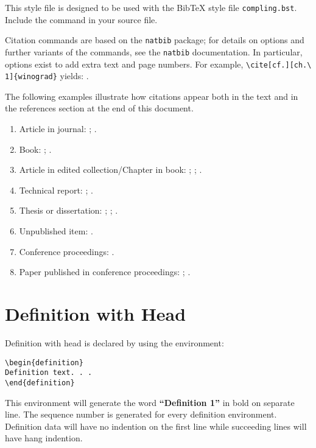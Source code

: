 \documentclass{clv3}
\begin{document}
This style file is designed to be used with the BibTeX
style file \verb|compling.bst|.  Include the command
\verb|| in your source file.

Citation commands are based on the \verb|natbib| package;
for details on options and further variants of the commands,
see the \verb|natbib| documentation.  In particular, options
exist to add extra text and page numbers.  For example,
\verb|\cite[cf.][ch.\ 1]{winograd}| yields: \cite[cf.][ch.\ 1]{winograd}.

The following examples illustrate how citations appear both in the text
and in the references section at the end of this document.
\begin{enumerate}
\item Article in journal:
 ;
 .
\item Book:
  ;
  .
\item Article in edited collection/Chapter in book:
  ;
  ;
  .
\item Technical report:
  ;
  .
\item Thesis or dissertation:
  ;
  ;
  .
\item Unpublished item:
  .
\item Conference proceedings:
  .
\item Paper published in conference proceedings:
  ;
  .
\end{enumerate}


\section{Definition with Head}

Definition with head is declared by using the environment:
\\
\begin{verbatim}
\begin{definition}
Definition text. . .
\end{definition}
\end{verbatim}

This environment will generate the word {\bf ``Definition 1''} in bold on separate
line. The sequence number is generated for every definition environment. Definition
data will have no indention on the first line while succeeding lines will have hang
indention.
\end{document}
